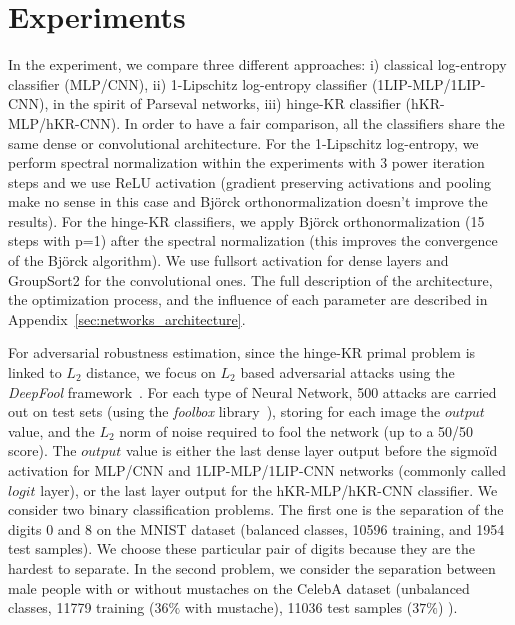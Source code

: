 \documentclass{article}
\begin{document}
\section{Experiments}
\label{sec:experimentation}
In the experiment, we compare three different approaches: i) classical log-entropy classifier (MLP/CNN), ii) 1-Lipschitz log-entropy classifier (1LIP-MLP/1LIP-CNN), in the spirit of Parseval networks, iii) hinge-KR classifier (hKR-MLP/hKR-CNN). In order to have a fair comparison, all the classifiers share the same dense or convolutional architecture. 
For the 1-Lipschitz log-entropy, we perform spectral normalization within the experiments with 3 power iteration steps and we use ReLU activation (gradient preserving activations and pooling make no sense in this case and Björck orthonormalization doesn't improve the results). For the hinge-KR classifiers, we apply Björck orthonormalization (15 steps with p=1) after the spectral normalization (this improves the convergence of the Björck algorithm). We use fullsort activation for dense layers and GroupSort2 for the convolutional ones. The full description of the architecture, the optimization process, and the influence of each parameter are described in Appendix~\ref{sec:networks_architecture}. 

For adversarial robustness estimation, since the hinge-KR primal problem is linked to $L_2$ distance, we focus on $L_2$ based adversarial attacks using the \textit{DeepFool} framework~\cite{moosavi-deepfool15}. For each type of Neural Network, 500 attacks are carried out on test sets (using the \textit{foolbox} library~\cite{rauber_foolbox_2018}), storing for each image the $output$ value, and the $L_2$ norm of noise  required to fool the network (up to a 50/50 score). The $output$ value is either the last dense layer output before the sigmo\"id activation for MLP/CNN and 1LIP-MLP/1LIP-CNN networks (commonly called $logit$ layer), or the last layer output for the hKR-MLP/hKR-CNN classifier. %
We consider two binary classification problems. The first one is the separation of the digits 0 and 8 on the MNIST dataset (balanced classes, 10596 training, and 1954 test samples). We choose these particular pair of digits because they are the hardest to separate. In the second problem, we consider the separation between male people with or without mustaches on the CelebA dataset \cite{liu2015faceattributes} (unbalanced classes, 11779 training ($36\%$ with mustache), 11036 test samples ($37\%$) ).
\end{document}
